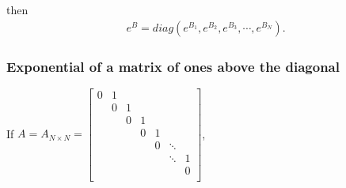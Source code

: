 \documentclass[letterpaper,10pt,english]{jupyterBook}
\begin{document}
\sphinxAtStartPar
then
\begin{equation*}
\begin{split}
e^B = diag(e^{B_1}, e^{B_2}, e^{B_3}, \dotsm, e^{B_N}).
\end{split}
\end{equation*}

\subsubsection{Exponential of a matrix of ones above the diagonal}
\label{\detokenize{cap3:exponential-of-a-matrix-of-ones-above-the-diagonal}}
\sphinxAtStartPar
If \(A = A_{N \times N} =   
\left[ {\begin{array}{ccccccc}
    0 & 1 &  &  &  &  & \\
     & 0 & 1 &  &  &  &\\
     &  & 0 & 1 &  &  &\\
     &  &  & 0 & 1 &  &\\
     &  &  &  & 0 & \ddots &  \\
     &  &  &  &  & \ddots & 1 \\
     &  &  &  &  &  & 0 \\
\end{array} } \right] \),
\end{document}
